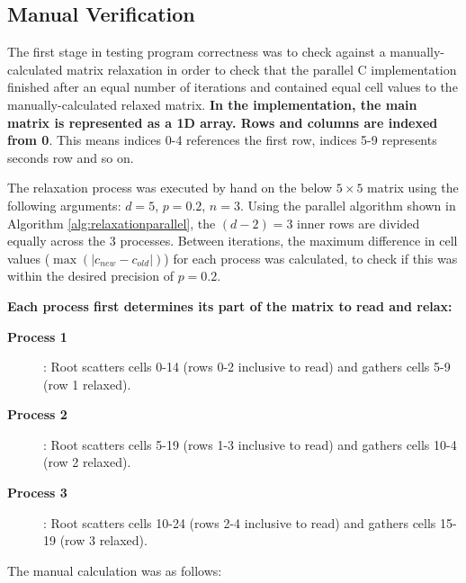 \documentclass[11pt]{article}
\begin{document}
{\color{darkindigo}
\subsection*{Manual Verification}}
The first stage in testing program correctness was to check against a manually-calculated matrix relaxation in order to check that the parallel C implementation finished after an equal number of iterations and contained equal cell values to the manually-calculated relaxed matrix. \textbf{In the implementation, the main matrix is represented as a 1D array. Rows and columns are indexed from 0}. This means indices 0-4 references the first row, indices 5-9 represents seconds row and so on. 

The relaxation process was executed by hand on the below $5 \times 5$ matrix using the following arguments: $d = 5$, $p = 0.2$, $n = 3$.  Using the parallel algorithm shown in Algorithm \ref{alg:relaxationparallel}, the $(d-2) = 3$ inner rows are divided equally across the 3 processes. Between iterations, the maximum difference in cell values ($\max(|c_{new}-c_{old}|)$) for each process was calculated, to check if this was within the desired precision of $p = 0.2$. 

\textbf{Each process first determines its part of the matrix to read and relax:}
\begin{description}
\item[\textbf{Process 1}]: Root scatters cells 0-14 (rows 0-2 inclusive to read) and gathers cells 5-9 (row 1 relaxed).
\item[\textbf{Process 2}]: Root scatters cells 5-19 (rows 1-3 inclusive to read) and gathers cells 10-4 (row 2 relaxed).
\item[\textbf{Process 3}]: Root scatters cells 10-24 (rows 2-4 inclusive to read) and gathers cells 15-19 (row 3 relaxed).
\end{description}

The manual calculation was as follows:
\end{document}

